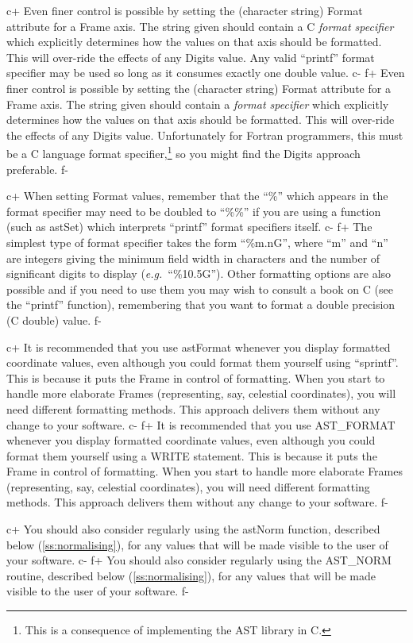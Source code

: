 \documentclass[twoside,11pt]{article}
\newcommand{\secref}[1]{\S\ref{#1}}
\renewcommand{\secref}[1]{\ref{#1}}
\begin{document}
c+
Even finer control is possible by setting the (character string)
Format attribute for a Frame axis. The string given should contain a C
{\em{format specifier}} which explicitly determines how the values on
that axis should be formatted. This will over-ride the effects of any
Digits value. Any valid ``printf'' format specifier may be used so
long as it consumes exactly one double value.
c-
f+
Even finer control is possible by setting the (character string)
Format attribute for a Frame axis. The string given should contain a
{\em{format specifier}} which explicitly determines how the values on
that axis should be formatted. This will over-ride the effects of any
Digits value.  Unfortunately for Fortran programmers, this must be a C
language format specifier,\footnote{This is a consequence of
implementing the AST library in C.} so you might find the Digits
approach preferable.
f-

c+
When setting Format values, remember that the ``\%'' which appears in
the format specifier may need to be doubled to ``\%\%'' if you are
using a function (such as astSet) which interprets ``printf'' format
specifiers itself.
c-
f+
The simplest type of format specifier takes the form ``\%m.nG'', where
``m'' and ``n'' are integers giving the minimum field width in
characters and the number of significant digits to display
({\em{e.g.}}\ ``\%10.5G''). Other formatting options are also possible
and if you need to use them you may wish to consult a book on C (see
the ``printf'' function), remembering that you want to format a double
precision (C double) value.
f-

c+
It is recommended that you use astFormat whenever you display
formatted coordinate values, even although you could format them
yourself using ``sprintf''. This is because it puts the Frame in
control of formatting. When you start to handle more elaborate Frames
(representing, say, celestial coordinates), you will need different
formatting methods. This approach delivers them without any change to
your software.
c-
f+
It is recommended that you use AST\_FORMAT whenever you display
formatted coordinate values, even although you could format them
yourself using a WRITE statement. This is because it puts the Frame in
control of formatting. When you start to handle more elaborate Frames
(representing, say, celestial coordinates), you will need different
formatting methods. This approach delivers them without any change to
your software.
f-

c+
You should also consider regularly using the astNorm function,
described below (\secref{ss:normalising}), for any values that will be
made visible to the user of your software.
c-
f+
You should also consider regularly using the AST\_NORM routine,
described below (\secref{ss:normalising}), for any values that will be
made visible to the user of your software.
f-
\end{document}
